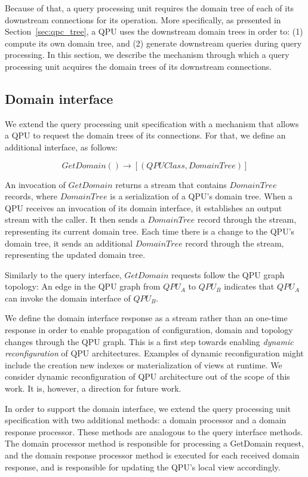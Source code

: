 Because of that, a query processing unit requires the domain tree of each of its downstream connections for its operation.
More specifically, as presented in Section~\ref{sec:qpc_tree}, a QPU uses the downstream domain trees in order to:
(1) compute its own domain tree, and (2) generate downstream queries during query processing.
In this section, we describe the mechanism through which a query processing unit acquires the domain trees
of its downstream connections.

\subsection{Domain interface}
We extend the query processing unit specification with a mechanism that allows a QPU to request the domain trees of its connections.
For that, we define an additional interface, as follows:

\begin{displaymath}
  GetDomain() \rightarrow [(QPUClass, DomainTree)]
\end{displaymath}

An invocation of $GetDomain$ returns a stream that contains $DomainTree$ records, where $DomainTree$ is a serialization of a QPU's domain tree.
When a QPU receives an invocation of its domain interface, it establishes an output stream with the caller.
It then sends a $DomainTree$ record through the stream, representing its current domain tree.
Each time there is a change to the QPU's domain tree, it sends an additional $DomainTree$ record through the stream,
representing the updated domain tree.

Similarly to the query interface, $GetDomain$ requests follow the QPU graph topology:
An edge in the QPU graph from $QPU_A$ to $QPU_B$ indicates that $QPU_A$ can invoke the domain interface of $QPU_B$.

\medskip
\noindent
We define the domain interface response as a stream rather than an one-time response in order to enable propagation of
configuration, domain and topology changes through the QPU graph.
This is a first step towards enabling \textit{dynamic reconfiguration} of QPU architectures.
Examples of dynamic reconfiguration might include the creation new indexes or materialization of views at runtime.
We consider dynamic reconfiguration of QPU architecture out of the scope of this work.
It is, however, a direction for future work.

\medskip
\noindent
In order to support the domain interface, we extend the query processing unit specification with two additional methods:
a domain processor and a domain response processor.
These methods are analogous to the query interface methods.
The domain processor method is responsible for processing a GetDomain request,
and the domain response processor method is executed for each received domain response,
and is responsible for updating the QPU's local view accordingly.

